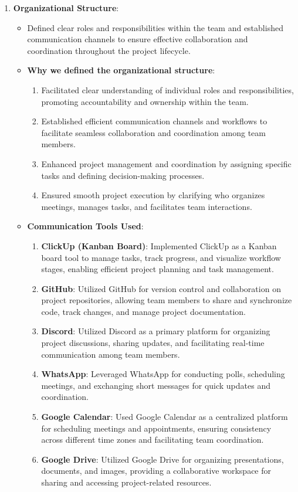 \begin{enumerate}
    \item \textbf{Organizational Structure}:
    \begin{itemize}
        \item Defined clear roles and responsibilities within the team and established communication channels to ensure effective collaboration and coordination throughout the project lifecycle.
        \item \textbf{Why we defined the organizational structure}:
            \begin{enumerate}
                \item Facilitated clear understanding of individual roles and responsibilities, promoting accountability and ownership within the team.
                \item Established efficient communication channels and workflows to facilitate seamless collaboration and coordination among team members.
                \item Enhanced project management and coordination by assigning specific tasks and defining decision-making processes.
                \item Ensured smooth project execution by clarifying who organizes meetings, manages tasks, and facilitates team interactions.
            \end{enumerate}
            \item \textbf{Communication Tools Used}:
            \begin{enumerate}
                \item \textbf{ClickUp (Kanban Board)}: Implemented ClickUp as a Kanban board tool to manage tasks, track progress, and visualize workflow stages, enabling efficient project planning and task management.
                \item \textbf{GitHub}: Utilized GitHub for version control and collaboration on project repositories, allowing team members to share and synchronize code, track changes, and manage project documentation.
                \item \textbf{Discord}: Utilized Discord as a primary platform for organizing project discussions, sharing updates, and facilitating real-time communication among team members.
                \item \textbf{WhatsApp}: Leveraged WhatsApp for conducting polls, scheduling meetings, and exchanging short messages for quick updates and coordination.
                \item \textbf{Google Calendar}: Used Google Calendar as a centralized platform for scheduling meetings and appointments, ensuring consistency across different time zones and facilitating team coordination.
                \item \textbf{Google Drive}: Utilized Google Drive for organizing presentations, documents, and images, providing a collaborative workspace for sharing and accessing project-related resources.
            \end{enumerate}        
    \end{itemize}
\end{enumerate}


